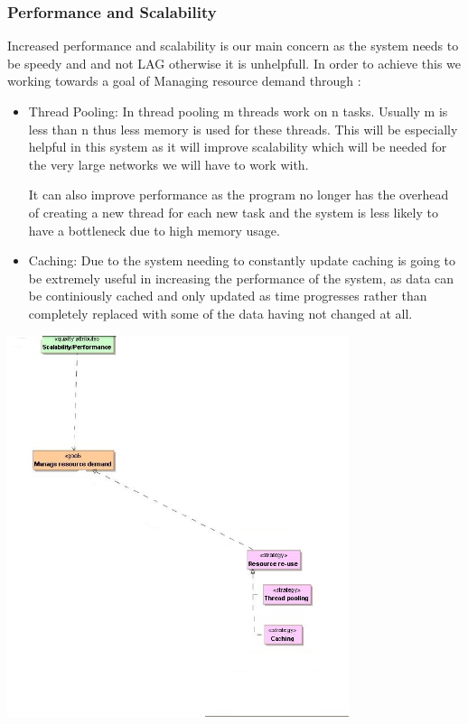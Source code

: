 \documentclass[a4paper,12pt]{report}
\begin{document}
		\subsubsection{Performance and Scalability}
		Increased performance and scalability is our main concern as the system needs to be speedy and and not LAG otherwise it is unhelpfull. In order to achieve this we working towards a goal of Managing resource demand through :
		\begin{itemize}
			\item
		Thread Pooling: In thread pooling m threads work on n tasks. Usually m is less than n thus less memory is used for these threads. This will be especially helpful in this system as it will improve scalability which will be needed for the very large networks we will have to work with. 
		
		It can also improve performance as the program no longer has the overhead of creating a new thread for each new task and the system is less likely to have a bottleneck due to high memory usage.
		\end{itemize}
		
\begin{itemize}
			\item
		Caching: Due to the system needing to constantly update caching is going to be extremely useful in increasing the performance of the system, as data can be continiously cached and only updated as time progresses rather than completely replaced with some of the data having not changed at all.
		\end{itemize}
\includegraphics[width=10cm]{./performancefigure.jpg}
\end{document}
